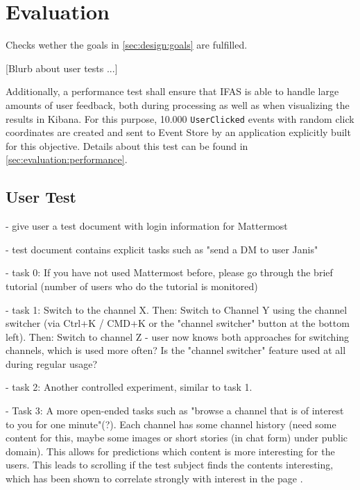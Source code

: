 %
\chapter{Evaluation}
\label{ch:evaluation}


Checks wether the goals in \cref{sec:design:goals} are fulfilled.

[Blurb about user tests ...]

Additionally, a performance test shall ensure that \acf{IFAS} is able to handle large amounts of user feedback, both during processing as well as when visualizing the results in Kibana.
For this purpose, 10.000 \texttt{UserClicked} events with random click coordinates are created and sent to Event Store by an application explicitly built for this objective.
Details about this test can be found in \cref{sec:evaluation:performance}.


\section{User Test}
\label{sec:evaluation:user}


- give user a test document with login information for Mattermost

- test document contains explicit tasks such as "send a DM to user Janis"

- task 0: If you have not used Mattermost before, please go through the brief tutorial (number of users who do the tutorial is monitored)

- task 1: Switch to the channel X. Then: Switch to Channel Y using the channel switcher (via Ctrl+K / CMD+K or the "channel switcher" button at the bottom left). Then: Switch to channel Z - user now knows both approaches for switching channels, which is used more often? Is the "channel switcher" feature used at all during regular usage?

- task 2: Another controlled experiment, similar to task 1.

- Task 3: A more open-ended tasks such as "browse a channel that is of interest to you for one minute"(?).
Each channel has some channel history (need some content for this, maybe some images or short stories (in chat form) under public domain).
This allows for predictions which content is more interesting for the users.
This leads to scrolling if the test subject finds the contents interesting, which has been shown to correlate strongly with interest in the page \cite{Claypool2001}.

